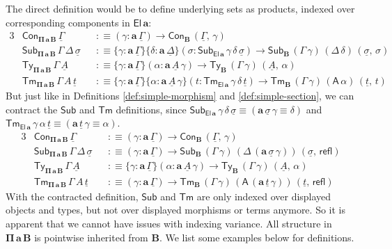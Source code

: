 \documentclass[12pt,a4paper,twoside,openany]{book}
\theoremstyle{remark}
\theoremstyle{definition}
\theoremstyle{theorem}
\newcommand{\bs}[1]{\boldsymbol{#1}}
\newcommand{\refl}{\mathsf{refl}}
\newcommand{\Con}{\mathsf{Con}}
\newcommand{\Sub}{\mathsf{Sub}}
\newcommand{\Tm}{\mathsf{Tm}}
\newcommand{\Ty}{\mathsf{Ty}}
\newcommand{\El}{\mathsf{El}}
\newcommand{\A}{\mathsf{A}}
\newcommand{\ba}{\bs{a}}
\newcommand{\bB}{\bs{B}}
\newcommand{\ul}[1]{\underline{#1}}
\newcommand{\ulGamma}{\ul{\Gamma}}
\newcommand{\ulDelta}{\ul{\Delta}}
\newcommand{\ulsigma}{\ul{\sigma}}
\newcommand{\ult}{\ul{t}}
\newcommand{\ulA}{\ul{A}}
\newcommand{\defn}{:\equiv}
\begin{document}
The direct definition would be to define underlying sets as products, indexed
over corresponding components in $\bs{\El\,a}$:
\begin{alignat*}{3}
  & \Con_{\bs{\Pi\,a\,B}}\,\ulGamma &&\defn (\gamma : \ba\,\ulGamma) \to \Con_{\bB}\,(\ulGamma,\,\gamma)\\
  & \Sub_{\bs{\Pi\,a\,B}}\,\Gamma\,\Delta\,\ulsigma &&\defn
    \{\gamma : \ba\,\ulGamma\}\{\delta : \ba\,\ulDelta\}(\sigma : \Sub_{\bs{\El\,a}}\,\gamma\,\delta\,\ulsigma) \to \Sub_{\bB}\,(\Gamma\,\gamma)\,(\Delta\,\delta)\,(\ulsigma,\,\sigma)\\
  & \Ty_{\bs{\Pi\,a\,B}}\,\Gamma\,\ulA &&\defn
    \{\gamma : \ba\,\ulGamma\}(\alpha : \ba\,\ulA\,\gamma) \to \Ty_{\bB}\,(\Gamma\,\gamma)\,(\ulA,\,\alpha)\\
  & \Tm_{\bs{\Pi\,a\,B}}\,\Gamma\,A\,\ult &&\defn
    \{\gamma : \ba\,\ulGamma\}\{\alpha : \ba\,\ulA\,\gamma\}(t : \Tm_{\bs{\El\,a}}\,\gamma\,\delta\,\ult)
      \to
    \Tm_{\bB}\,(\Gamma\,\gamma)\,(\A\,\alpha)\,(\ult,\,t)
\end{alignat*}
But just like in Definitions \ref{def:simple-morphism} and
\ref{def:simple-section}, we can contract the $\Sub$ and $\Tm$ definitions,
since $\Sub_{\bs{\El\,a}}\,\gamma\,\delta\,\ulsigma \equiv
(\ba\,\ulsigma\,\gamma \equiv \delta)$ and
$\Tm_{\bs{\El\,a}}\,\gamma\,\alpha\,\ult \equiv (\ba\,\ult\,\gamma \equiv
\alpha)$.
\begin{alignat*}{3}
  & \Con_{\bs{\Pi\,a\,B}}\,\ulGamma &&\defn (\gamma : \ba\,\ulGamma) \to \Con_{\bB}\,(\ulGamma,\,\gamma)\\
  & \Sub_{\bs{\Pi\,a\,B}}\,\Gamma\,\Delta\,\ulsigma &&\defn
    (\gamma : \ba\,\ulGamma)\to \Sub_{\bB}\,(\Gamma\,\gamma)\,(\Delta\,(\ba\,\ulsigma\,\gamma))\,(\ulsigma,\,\refl)\\
  & \Ty_{\bs{\Pi\,a\,B}}\,\Gamma\,\ulA &&\defn
  \{\gamma : \ba\,\ulGamma\}(\alpha : \ba\,\ulA\,\gamma)
  \to \Ty_{\bB}\,(\Gamma\,\gamma)\,(\ulA,\,\alpha)\\
  & \Tm_{\bs{\Pi\,a\,B}}\,\Gamma\,A\,\ult &&\defn
    (\gamma : \ba\,\ulGamma) \to \Tm_{\bB}\,(\Gamma\,\gamma)\,(\A\,(\ba\,\ult\,\gamma))\,(\ult,\,\refl)
\end{alignat*}
With the contracted definition, $\Sub$ and $\Tm$ are only indexed over displayed
objects and types, but not over displayed morphisms or terms anymore. So it is
apparent that we cannot have issues with indexing variance. All structure in
$\bs{\Pi\,a\,B}$ is pointwise inherited from $\bB$. We list some examples below
for definitions.
\end{document}
